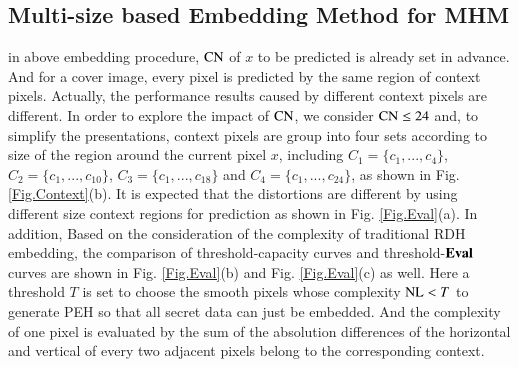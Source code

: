 \documentclass[review,3p,10pt,sort&compress]{elsarticle}
\begin{document}
\subsection{Multi-size based Embedding Method for MHM}\label{sec:3.2}
in above embedding procedure, ${\rm CN}$ of $x$ to be predicted is already set in advance. And for a cover image, every pixel is predicted by the same region of context pixels. Actually, the performance results caused by different context pixels are different. In order to explore the impact of ${\rm CN}$, we consider ${\rm CN} \leq 24$ and, to simplify the presentations, context pixels are group into four sets according to size of the region around the current pixel $x$, including $C_1 = \{c_1, ..., c_4\}$, $C_2 = \{c_1, ..., c_{10}\}$, $C_3 = \{c_1, ..., c_{18}\}$ and $C_4 = \{c_1, ..., c_{24}\}$, as shown in Fig. \ref{Fig.Context}(b). It is expected that the distortions are different by using different size context regions for prediction as shown in Fig. \ref{Fig.Eval}(a). In addition, Based on the consideration of the complexity of traditional RDH embedding, the comparison of threshold-capacity curves and threshold-${\rm \mathbf{Eval}}$ curves are shown in Fig. \ref{Fig.Eval}(b) and Fig. \ref{Fig.Eval}(c) as well. Here a threshold $T$ is set to choose
the smooth pixels whose complexity ${\rm NL} < T$ to generate PEH so that all secret data can just be embedded. And the complexity of one pixel is evaluated by the sum of the absolution differences of the horizontal and vertical of every two adjacent pixels belong to the corresponding context.
\end{document}
